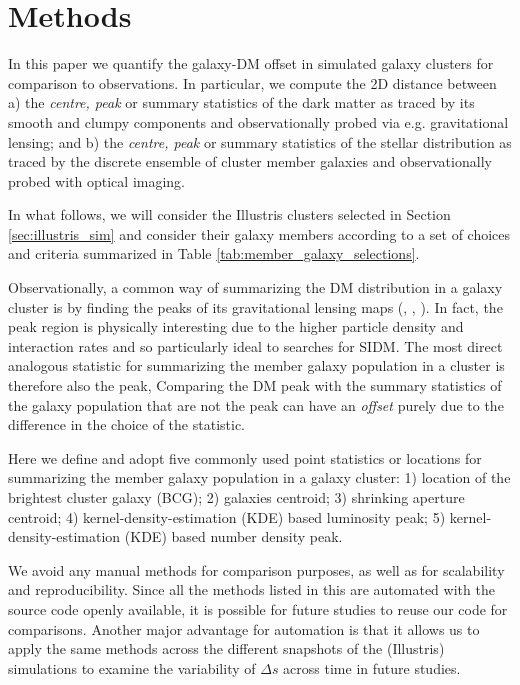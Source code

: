 \documentclass[usenatbib]{mn2e}
\begin{document}
{%
\section{Methods}\label{sec:methods}

In this paper we quantify the galaxy-DM offset in simulated galaxy clusters for comparison to observations.
In particular, we compute the 2D distance between a) the {\it centre, peak} or summary statistics of the dark matter as traced by its smooth and clumpy components and observationally probed via e.g. gravitational lensing; and b) the {\it centre, peak} or summary statistics of the stellar distribution as traced by the discrete ensemble of cluster member galaxies and observationally probed with optical imaging.

In what follows, we will consider the Illustris clusters selected in Section \ref{sec:illustris_sim} and consider their galaxy members according to a set of choices and criteria summarized in Table \ref{tab:member_galaxy_selections}.

Observationally, a common way of summarizing the DM distribution in a
galaxy cluster is by finding the peaks of its gravitational lensing maps
(\citealt{Medezinski2013}, \citealt{Markevitch2004}, 
\citealt{Zitrin13}). In fact, the peak region is physically 
interesting due to the higher particle density and interaction rates and so particularly ideal to searches for SIDM.
%
The most direct analogous statistic for summarizing the member galaxy
population in a cluster is therefore also the peak, 
Comparing the DM peak with the summary statistics of the galaxy population that
are not the peak  can have an {\it offset} purely due to the difference in
the choice of the statistic. 

Here we define and adopt five commonly used 
point statistics or locations for summarizing 
the member galaxy population in a galaxy cluster:
1) location of the brightest cluster galaxy (BCG); 2) galaxies centroid; 3) shrinking aperture centroid; 4) kernel-density-estimation (KDE) based luminosity peak; 5) kernel-density-estimation (KDE) based number density peak.

We avoid any manual methods for
comparison purposes, as well as for scalability and reproducibility. 
Since all the methods listed in this 
are automated with the source code openly available, 
it is possible for future studies to reuse our code for comparisons. 
Another major advantage for automation is that it allows us  
to apply the same methods across the different snapshots of the (Illustris) simulations to
examine the variability of $\Delta s$ across time in future studies. 


}
\end{document}
